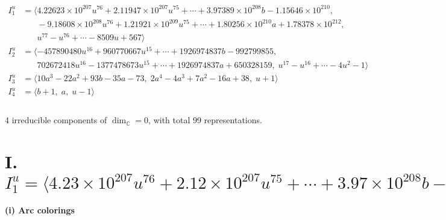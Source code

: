 \documentclass[1p]{elsarticle_modified}
\theoremstyle{definition}
\begin{document}
\begin{align*}
I^u_{1}&=\langle 
4.22623\times10^{207} u^{76}+2.11947\times10^{207} u^{75}+\cdots+3.97389\times10^{208} b-1.15646\times10^{210},\\
\phantom{I^u_{1}}&\phantom{= \langle  }-9.18608\times10^{208} u^{76}+1.21921\times10^{209} u^{75}+\cdots+1.80256\times10^{210} a+1.78378\times10^{212},\\
\phantom{I^u_{1}}&\phantom{= \langle  }u^{77}- u^{76}+\cdots-8509 u+567\rangle \\
I^u_{2}&=\langle 
-457890480 u^{16}+960770667 u^{15}+\cdots+1926974837 b-992799855,\\
\phantom{I^u_{2}}&\phantom{= \langle  }702672418 u^{16}-1377478673 u^{15}+\cdots+1926974837 a+650328159,\;u^{17}- u^{16}+\cdots-4 u^2-1\rangle \\
I^u_{3}&=\langle 
10 a^3-22 a^2+93 b-35 a-73,\;2 a^4-4 a^3+7 a^2-16 a+38,\;u+1\rangle \\
I^u_{4}&=\langle 
b+1,\;a,\;u-1\rangle \\
\\
\end{align*}
\raggedright * 4 irreducible components of $\dim_{\mathbb{C}}=0$, with total 99 representations.\\
\newpage
\renewcommand{\arraystretch}{1}
\centering \section*{I. $I^u_{1}= \langle 4.23\times10^{207} u^{76}+2.12\times10^{207} u^{75}+\cdots+3.97\times10^{208} b-1.16\times10^{210},\;-9.19\times10^{208} u^{76}+1.22\times10^{209} u^{75}+\cdots+1.80\times10^{210} a+1.78\times10^{212},\;u^{77}- u^{76}+\cdots-8509 u+567 \rangle$}
\flushleft \textbf{(i) Arc colorings}\\
\end{document}

